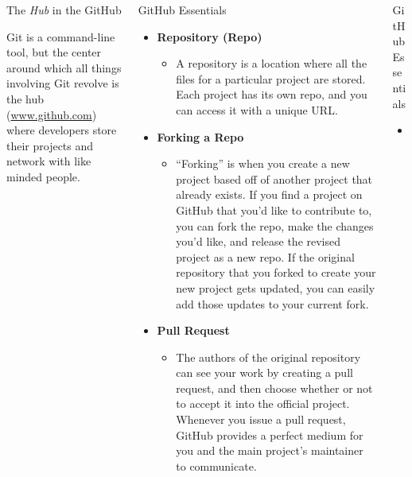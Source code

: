 \documentclass{beamer}
\begin{document}
\begin{frame}[fragile]
\begin{columns}[T]
\begin{column}{.33\textwidth}
\begin{block}{The \emph{Hub} in the GitHub}
\item Git is a command-line tool, but the center around which all things involving Git revolve is the hub (\url{www.github.com}) where developers store their projects and network with like minded people.
\end{block}
\end{column}
\begin{column}{.33\textwidth}
\begin{block}{GitHub Essentials}
\begin{itemize}
\item \textbf{Repository (Repo)}
\begin{itemize}
\item A repository is a location where all the files for a particular project are stored. Each project has its own repo, and you can access it with a unique URL.
\end{itemize}
\item \textbf{Forking a Repo}
\begin{itemize}
\item “Forking” is when you create a new project based off of another project that already exists. If you find a project on GitHub that you’d like to contribute to, you can fork the repo, make the changes you’d like, and release the revised project as a new repo. If the original repository that you forked to create your new project gets updated, you can easily add those updates to your current fork.
\end{itemize}
\item \textbf{Pull Request}
\begin{itemize}
\item The authors of the original repository can see your work by creating a pull request, and then choose whether or not to accept it into the official project. Whenever you issue a pull request, GitHub provides a perfect medium for you and the main project’s maintainer to communicate.
\end{itemize}
\end{itemize}
\end{block}
\end{column}
\begin{column}{.3\textwidth}
\begin{block}{GitHub Essentials}
\begin{itemize}
    \item \textbf{Social Networking}

\end{itemize}
\end{block}
\end{column}
\end{columns}
\end{frame}
\end{document}
